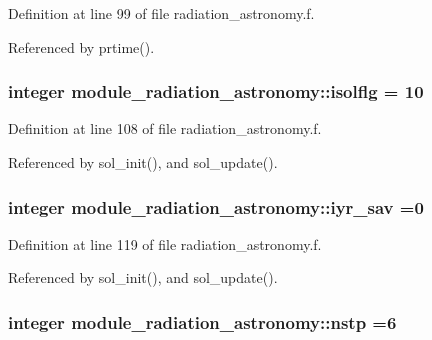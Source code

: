 Definition at line 99 of file radiation\+\_\+astronomy.\+f.



Referenced by prtime().

\subsubsection[{\texorpdfstring{isolflg}{isolflg}}]{\setlength{\rightskip}{0pt plus 5cm}integer module\+\_\+radiation\+\_\+astronomy\+::isolflg = 10\hspace{0.3cm}{\ttfamily [private]}}\hypertarget{group__module__radiation__astronomy_ga7ea431b6d4f4d6ee1f6545d6baeee44f}{}\label{group__module__radiation__astronomy_ga7ea431b6d4f4d6ee1f6545d6baeee44f}


Definition at line 108 of file radiation\+\_\+astronomy.\+f.



Referenced by sol\+\_\+init(), and sol\+\_\+update().

\subsubsection[{\texorpdfstring{iyr\+\_\+sav}{iyr_sav}}]{\setlength{\rightskip}{0pt plus 5cm}integer module\+\_\+radiation\+\_\+astronomy\+::iyr\+\_\+sav =0\hspace{0.3cm}{\ttfamily [private]}}\hypertarget{group__module__radiation__astronomy_ga83370fbee96388e545a89eb25ed6df90}{}\label{group__module__radiation__astronomy_ga83370fbee96388e545a89eb25ed6df90}


Definition at line 119 of file radiation\+\_\+astronomy.\+f.



Referenced by sol\+\_\+init(), and sol\+\_\+update().

\subsubsection[{\texorpdfstring{nstp}{nstp}}]{\setlength{\rightskip}{0pt plus 5cm}integer module\+\_\+radiation\+\_\+astronomy\+::nstp =6\hspace{0.3cm}{\ttfamily [private]}}\hypertarget{group__module__radiation__astronomy_gab93fe36440da3cc1f1d64cae2ec4c25b}{}\label{group__module__radiation__astronomy_gab93fe36440da3cc1f1d64cae2ec4c25b}


